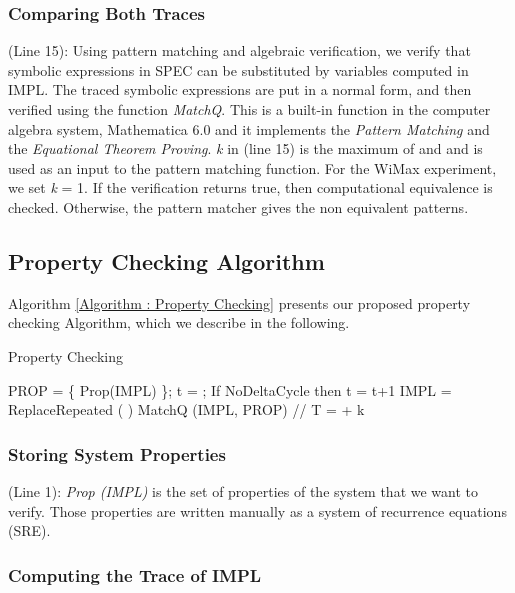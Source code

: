 \documentclass[submission,copyright,creativecommons]{eptcs}
\begin{document}
\subsubsection{Comparing Both Traces}

(Line 15): Using pattern matching and algebraic verification, we verify that symbolic expressions in SPEC can be substituted by variables computed in IMPL. The traced symbolic expressions are put in a normal form, and then verified using the function \emph{MatchQ}. This is a built-in function in the computer algebra system, Mathematica 6.0 \cite{6} and it implements the \emph{Pattern Matching} and the \emph{Equational Theorem Proving}. \emph{k} in (line 15) is the maximum of  and  and is used as an input to the pattern matching function. For the WiMax experiment, we set \emph{k} = 1. If the verification returns true, then computational equivalence is checked. Otherwise, the pattern matcher gives the non equivalent patterns.


\subsection{Property Checking Algorithm}
Algorithm \ref{Algorithm : Property Checking} presents our proposed property checking Algorithm, which we describe in the following.

\begin{algorithm}
\caption{Property Checking}
\label{Algorithm : Property Checking}
\begin{algorithmic}[1]
\STATE PROP = \{ Prop(IMPL) \};
\STATE t = ;
\STATE     
\WHILE{  }
\STATE 
\STATE If NoDeltaCycle then t = t+1
\ENDWHILE
\STATE IMPL = ReplaceRepeated (  )
\STATE MatchQ  (IMPL, PROP) // T =  + k

\end{algorithmic}
\end{algorithm}

\subsubsection{Storing System Properties}

(Line 1): \emph{Prop (IMPL)} is the set of properties of the system that we want to verify. Those properties are written manually as a system of recurrence equations (SRE).

\subsubsection{Computing the Trace of IMPL}
\end{document}

